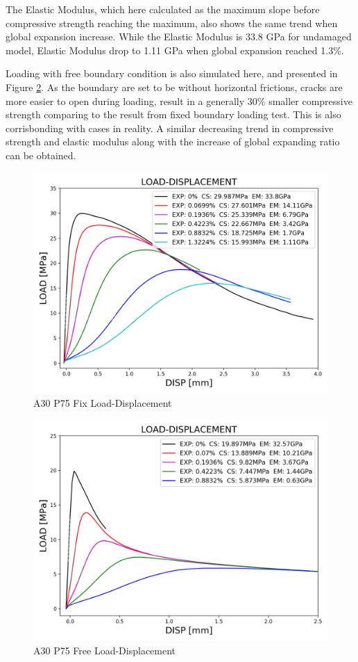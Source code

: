 The Elastic Modulus, which here calculated as the maximum slope before compressive strength reaching the maximum, also shows the same trend when global expansion increase. While the Elastic Modulus is 33.8 GPa for undamaged model, Elastic Modulus drop to 1.11 GPa when global expansion reached 1.3\%.

Loading with free boundary condition is also simulated here, and presented in Figure \ref{fig:A30P75FREE_LD}. As the boundary are set to be without horizontal frictions, cracks are more easier to open during loading, result in a generally 30\% smaller compressive strength comparing to the result from fixed boundary loading test. This is also corrisbonding with cases in reality. A similar decreasing trend in compressive strength and elastic modulus along with the increase of global expanding ratio can be obtained.


\begin{figure}[ht]
\centering
\includegraphics[width=.8\linewidth]{Files/exp_3D/ASR/S13A30P75FIX-LOAD-DISPLACEMENT.png}
  \caption{A30 P75 Fix Load-Displacement}
  \label{fig:A30P75FIX_LD}
\end{figure}


\begin{figure}[ht!]
\centering
\includegraphics[width=.8\linewidth]{Files/exp_3D/ASR/S13A30P75FREE-LOAD-DISPLACEMENT.png}
  \caption{A30 P75 Free Load-Displacement}
  \label{fig:A30P75FREE_LD}
\end{figure}

